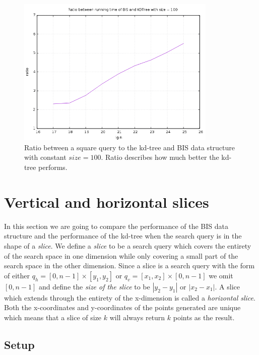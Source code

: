 \begin{figure}[h]
    \centering
    \includegraphics[width = 0.85\textwidth]{pictures/analysis/factor_difference_sqrtn_100.png}
    \caption{Ratio between a square query to the kd-tree and BIS data structure with constant $size = 100$. Ratio describes how much better the kd-tree performs.}\label{fig:factdiffsqrt100}
\end{figure}

\clearpage


\section{Vertical and horizontal slices}
\label{sect:slices}

In this section we are going to compare the performance of the BIS data structure and the performance of the kd-tree when the search query is in the shape of a \emph{slice}. We define a \emph{slice} to be a search query which covers the entirety of the search space in one dimension while only covering a small part of the search space in the other dimension. Since a slice is a search query with the form of either $q_h = [0, n-1] \times [y_1, y_2]$ or $q_v = [x_1, x_2] \times [0, n-1]$ we omit $[0, n-1]$ and define the \emph{size of the slice} to be $\left| y_2-y_1\right|$ or $\left|x_2-x_1\right|$. A slice which extends through the entirety of the x-dimension is called a \emph{horizontal slice}. Both the x-coordinates and y-coordinates of the points generated are unique which means that a slice of size $k$ will always return $k$ points as the result.

\subsection{Setup}

